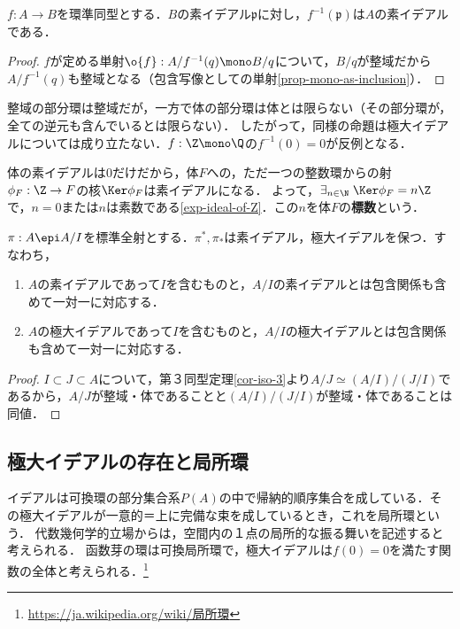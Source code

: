 \documentclass[uplatex,dvipdfmx]{jsreport}
\renewcommand{\p}{\mathfrak{p}}
\begin{document}
\begin{proposition}[逆像関手は素イデアルを保つ]\label{prop-preimage-of-prime-ideal-is-prime}
    $f:A\to B$を環準同型とする．$B$の素イデアル$\p$に対し，$f^{-1}(\p)$は$A$の素イデアルである．
\end{proposition}
\begin{proof}
    $f$が定める単射$\o{f}:A/f^{-1}(q)\mono B/q$について，$B/q$が整域だから$A/f^{-1}(q)$も整域となる（包含写像としての単射\ref{prop-mono-as-inclusion}）．
\end{proof}
\begin{remark}
    整域の部分環は整域だが，一方で体の部分環は体とは限らない（その部分環が，全ての逆元も含んでいるとは限らない）．
    したがって，同様の命題は極大イデアルについては成り立たない．$f:\Z\mono\Q$の$f^{-1}(0)=0$が反例となる．
\end{remark}
\begin{example}[characteristic]
    体の素イデアルは$0$だけだから，体$F$への，ただ一つの整数環からの射$\phi_F:\Z\to F$の核$\Ker\phi_F$は素イデアルになる．
    よって，$\exists_{n\in\N}\;\Ker\phi_F=n\Z$で，$n=0$または$n$は素数である\ref{exp-ideal-of-Z}．この$n$を体$F$の\textbf{標数}という．
\end{example}

\begin{proposition}\label{prop-correspondence-of-prime-and-maximal-ideals}
    $\pi:A\epi A/I$を標準全射とする．$\pi^*,\pi_*$は素イデアル，極大イデアルを保つ．すなわち，
    \begin{enumerate}
        \item $A$の素イデアルであって$I$を含むものと，$A/I$の素イデアルとは包含関係も含めて一対一に対応する．
        \item $A$の極大イデアルであって$I$を含むものと，$A/I$の極大イデアルとは包含関係も含めて一対一に対応する．
    \end{enumerate}
\end{proposition}
\begin{proof}
    $I\subset J\subset A$について，第３同型定理\ref{cor-iso-3}より$A/J\simeq(A/I)/(J/I)$であるから，$A/J$が整域・体であることと$(A/I)/(J/I)$が整域・体であることは同値．
\end{proof}

\subsection{極大イデアルの存在と局所環}

\begin{tcolorbox}[colframe=ForestGreen, colback=ForestGreen!10!white,breakable,colbacktitle=ForestGreen!40!white,coltitle=black,fonttitle=\bfseries\sffamily,
title=]
    イデアルは可換環の部分集合系$P(A)$の中で帰納的順序集合を成している．その極大イデアルが一意的＝上に完備な束を成しているとき，これを局所環という．
    代数幾何学的立場からは，空間内の１点の局所的な振る舞いを記述すると考えられる．
    函数芽の環は可換局所環で，極大イデアルは$f(0)=0$を満たす関数の全体と考えられる．\footnote{\url{https://ja.wikipedia.org/wiki/局所環}}
\end{tcolorbox}
\end{document}
